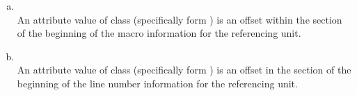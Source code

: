 \begin{enumerate}[(a)]
\item \dotdebuginfo{} \\
An attribute value of class 
 (specifically form
) is an 
offset within the 
\dotdebugmacinfo{} section
of the beginning of the macro information for the referencing unit.

\item \dotdebuginfo{} \\
An attribute value of class 
 (specifically form
) 
is an offset in the 
\dotdebugline{} section of the
beginning of the line number information for the referencing unit.
\end{enumerate}
